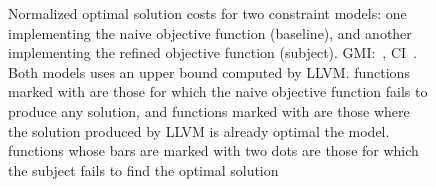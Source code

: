 

\begin{figure}
  \centering%
  \maxsizebox{\textwidth}{!}{%
    \trimBarchartPlot{%
    }%
  }

  \caption[%
            Plot for evaluating the different objective functions' impact on
            code quality%
          ]%
          {%
            Normalized optimal solution costs for two constraint models: one
            implementing the naive objective function (baseline), and another
            implementing the refined objective function (subject).
            GMI:~\printGMI{%
              \ObjFunRefinedVsNaiveCyclesSpeedupRefinedVsNaiveWUbCyclesRegularSpeedupGmean%
            },
            CI~\printGMICI{%
              \ObjFunRefinedVsNaiveCyclesSpeedupRefinedVsNaiveWUbCyclesRegularSpeedupCiMin%
            }{%
              \ObjFunRefinedVsNaiveCyclesSpeedupRefinedVsNaiveWUbCyclesRegularSpeedupCiMax%
            }.
            Both models uses an upper bound computed by LLVM.
            \Glspl{function} marked with \barValueNoBaselineSolution{} are
            those for which the naive objective function fails to produce any
            solution, and \glspl{function} marked with \barValueNoSolution{} are
            those where the solution produced by \gls{LLVM} is already optimal
            \wrt the model.
            \Glspl{function} whose bars are marked with two dots are those
            for which the \gls{subject} fails to find the optimal solution%
          }
\end{figure}

